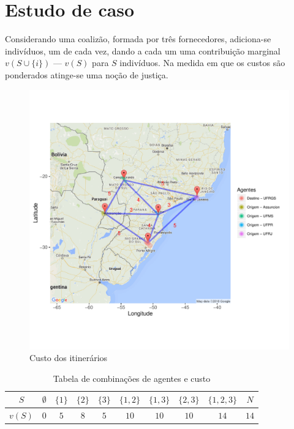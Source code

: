 \documentclass[
	article,			        %
	11pt,				          %
	oneside,			        %
	a4paper,			        %
	english,			        %
	brazil,				        %
	sumario=tradicional
]{abntex2}\usepackage[]{graphicx}\usepackage[]{color}
\makeatletter
\def\maxwidth{ %
  \ifdim\Gin@nat@width>\linewidth
    \linewidth
  \else
    \Gin@nat@width
  \fi
}
\newenvironment{knitrout}{}{} %
\makeatother
\begin{document}
\section{Estudo de caso}
\label{sec:R}

Considerando uma coalizão, formada por três fornecedores, adiciona-se indivíduos, um de cada vez, dando a cada um uma contribuição marginal $v(S \cup \{i\})$ --- $v(S)$ para $S$ indivíduos. Na medida em que os custos são ponderados atinge-se uma noção de justiça.

\begin{knitrout}
\color{fgcolor}\begin{figure}[H]

{\centering \includegraphics[width=\maxwidth]{figure/unnamed-chunk-2-1} 

}

\caption[Custo dos itinerários]{Custo dos itinerários}\label{fig:unnamed-chunk-2}
\end{figure}


\end{knitrout}

\begin{table}[!h]
  \centering
  \caption{Tabela de combinações de agentes e custo}
  \label{Tab1}
  \begin{tabular}{@{}cccccccccc@{}}
  \toprule
    $S$    & $\emptyset$ & $\{1\}$ & $\{2\}$ & $\{3\}$ & $\{1,2\}$ & $\{1,3\}$ & $\{2,3\}$ &     $\{1,2,3\}$ & $N$  \\ \midrule
    $v(S)$ & $0$         & $5$     & $8$     & $5$     & $10$      & $10$      & $10$      &     $14$        & $14$ \\ \bottomrule
  \end{tabular}
\end{table}
\end{document}
